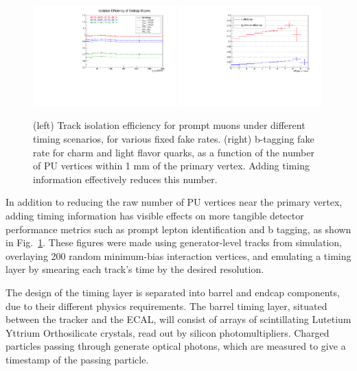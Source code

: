 \begin{figure}[t]
  \begin{center}
    \includegraphics[width=0.49\textwidth]{figs/cms/mtd_muiso.pdf}
    \includegraphics[width=0.49\textwidth]{figs/cms/mtd_btag.pdf}
    \caption{(left) Track isolation efficiency for prompt muons under different
      timing scenarios, for various fixed fake rates. (right) b-tagging fake rate
      for charm and light flavor quarks, as a function of the number of PU vertices
      within 1 mm of the primary vertex. Adding timing information effectively
      reduces this number.
            }
    \label{fig:mtd_isobtag}
  \end{center}
\end{figure}

In addition to reducing the raw number of PU vertices near the primary vertex, adding
timing information has visible effects on more tangible detector performance metrics
such as prompt lepton identification and b tagging, as shown in  Fig.~\ref{fig:mtd_isobtag}.
These figures were made using generator-level tracks from \ttbar simulation, overlaying
200 random minimum-bias interaction vertices, and emulating a timing layer by smearing
each track's time by the desired resolution.

The design of the timing layer is separated into barrel and endcap components, due to
their different physics requirements. The barrel timing layer, situated between
the tracker and the ECAL, will consist
of arrays of scintillating Lutetium Yttrium Orthosilicate crystals, read out by silicon
photomultipliers. Charged particles passing through generate optical photons, which are
measured to give a timestamp of the passing particle.

